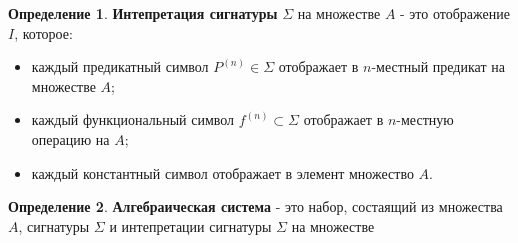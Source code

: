 \documentclass{report}
\theoremstyle{definition}
\newtheorem{definition}{Определение}[section]
\begin{document}
\begin{definition}
    \textbf{Интепретация сигнатуры} $\Sigma$ на множестве $A$ - это отображение $I$, которое:
    \begin{itemize}
        \item каждый предикатный символ $P^{(n)} \in \Sigma$ отображает в $n$-местный предикат на множестве $A$;
        \item каждый функциональный символ $f^{(n)} \subset \Sigma$ отображает в $n$-местную операцию на $A$;
        \item каждый константный символ отображает в элемент множество $A$.
    \end{itemize}
\end{definition}

\begin{definition}
    \textbf{Алгебраическая система} - это набор, состаящий из множества $A$, сигнатуры $\Sigma$ и интепретации сигнатуры $\Sigma$ на множестве 
\end{definition}
\end{document}
